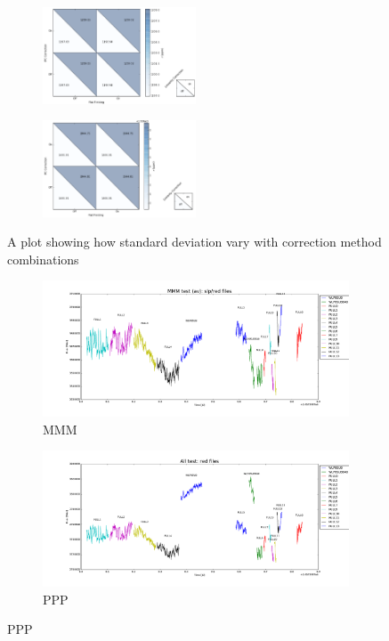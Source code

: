 \documentclass[conference]{IEEEtran}
\begin{document}
\begin{figure}[H]
    \begin{subfigure}{3}
        \includegraphics[width=0.5\textwidth]{correction2}
    \end{subfigure}
    
    \begin{subfigure}{4}
        \includegraphics[width=0.5\textwidth]{correction3}
    \end{subfigure}
    \caption{A plot showing how standard deviation vary with correction method combinations}
\end{figure}


\begin{figure}[H]
    \centering
    \begin{subfigure}{1}
        \includegraphics[scale = 0.3]{plot_mmm}
        \caption{MMM}
    \end{subfigure}

    \begin{subfigure}{2}
        \includegraphics[scale=0.3]{plot_PPP}
        \caption{PPP}
    \end{subfigure}
\end{figure}
\end{document}
